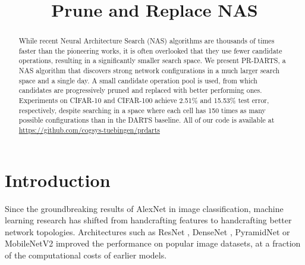\documentclass[conference]{IEEEtran}
\begin{document}
\title{Prune and Replace NAS}

\author{
	\and
}

\maketitle

\begin{abstract}
	While recent Neural Architecture Search (NAS) algorithms are thousands of times faster than the pioneering works, it is often overlooked that they use fewer candidate operations, resulting in a significantly smaller search space.
	We present PR-DARTS, a NAS algorithm that discovers strong network configurations in a much larger search space and a single day. A small candidate operation pool is used, from which candidates are progressively pruned and replaced with better performing ones.
	Experiments on CIFAR-10 and CIFAR-100 achieve 2.51\% and 15.53\% test error, respectively, despite searching in a space where each cell has 150 times as many possible configurations than in the DARTS baseline.
	All of our code is available at \url{https://github.com/cogsys-tuebingen/prdarts}
\end{abstract}





\section{Introduction}
\label{s_introduction}

Since the groundbreaking results of AlexNet \cite{net_alex} in image classification, machine learning research has shifted from handcrafting features to handcrafting better network topologies. Architectures such as ResNet \cite{net_res}, DenseNet \cite{net_dense}, PyramidNet \cite{net_pyr} or MobileNetV2 \cite{net_mobv2} improved the performance on popular image datasets, at a fraction of the computational costs of earlier models.
\end{document}

